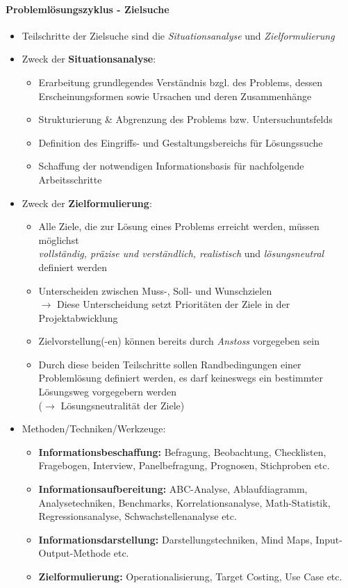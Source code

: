 \documentclass[a4paper]{article}
\begin{document}
		\paragraph{Problemlösungszyklus - Zielsuche}
		
			\begin{itemize}
				\item Teilschritte der Zielsuche sind die \textit{Situationsanalyse} und \textit{Zielformulierung}
				\item Zweck der \textbf{Situationsanalyse}:
					\begin{itemize}
						\item Erarbeitung grundlegendes Verständnis bzgl. des Problems, dessen Erscheinungsformen sowie Ursachen und deren Zusammenhänge
						\item Strukturierung \& Abgrenzung des Problems bzw. Untersuchuntsfelds
						\item Definition des Eingriffs- und Gestaltungsbereichs für Lösungssuche
						\item Schaffung der notwendigen Informationsbasis für nachfolgende Arbeitsschritte
					\end{itemize}
				\item Zweck der \textbf{Zielformulierung}:
					\begin{itemize}
						\item Alle Ziele, die zur Lösung eines Problems erreicht werden, müssen möglichst\\
						\textit{vollständig, präzise und verständlich, realistisch} und \textit{lösungsneutral} definiert werden
						\item Unterscheiden zwischen Muss-, Soll- und Wunschzielen\\
								$\rightarrow$ Diese Unterscheidung setzt Prioritäten der Ziele in der Projektabwicklung
						\item Zielvorstellung(-en) können bereits durch \textit{Anstoss} vorgegeben sein
						\item Durch diese beiden Teilschritte sollen Randbedingungen einer Problemlösung definiert werden, es darf keineswegs ein bestimmter Lösungsweg vorgegebern werden\\ ($\rightarrow$ Lösungsneutralität der Ziele)
					\end{itemize}
				\item Methoden/Techniken/Werkzeuge:
					\begin{itemize}
						\item \textbf{Informationsbeschaffung:} Befragung, Beobachtung, Checklisten, Fragebogen, Interview, Panelbefragung, Prognosen, Stichproben etc.
						\item \textbf{Informationsaufbereitung:} ABC-Analyse, Ablaufdiagramm, Analysetechniken, Benchmarks, Korrelationsanalyse, Math-Statistik, Regressionsanalyse, Schwachstellenanalyse etc.
						\item \textbf{Informationsdarstellung:} Darstellungstechniken, Mind Maps, Input-Output-Methode etc.
						\item \textbf{Zielformulierung:} Operationalisierung, Target Costing, Use Case etc.
					\end{itemize}
			\end{itemize}
	
\end{document}
